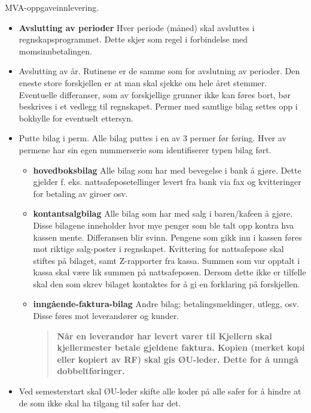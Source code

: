 MVA-oppgaveinnlevering.
\begin{itemize}
\item{}\textbf{Avslutting av perioder} Hver periode (måned) skal
  avsluttes i regnskapsprogrammet. Dette skjer som regel i forbindelse
  med momsinnbetalingen. 

\item{} Avslutting av år. Rutinene er de samme som for avslutning av
  perioder. Den eneste store forskjellen er at man skal sjekke om hele
  året stemmer. Eventuelle differanser, som av forskjellige grunner
  ikke kan føres bort, bør beskrives i et vedlegg til
  regnskapet. Permer med samtlige bilag settes opp i bokhylle for
  eventuelt ettersyn.

\item{} Putte bilag i perm. Alle bilag puttes i en av 3 permer før
  føring. Hver av permene har sin egen nummerserie som identifiserer
  typen bilag ført.

  \begin{itemize}
  \item{} \textbf{hovedboksbilag} Alle bilag som har med bevegelse i
    bank å gjøre. Dette gjelder f. eks. nattsafeposetellinger levert fra
    bank via fax og kvitteringer for betaling av giroer osv.
    
  \item{} \textbf{kontantsalgbilag} Alle bilag som har med salg i
    baren/kafeen å gjøre. Disse bilagene inneholder hvor mye penger som
    ble talt opp kontra hva kassen mente. Differansen blir
    svinn. Pengene som gikk inn i kassen føres mot riktige salg-poster i
    regnskapet. Kvittering for nattsafepose skal stiftes på bilaget,
    samt Z-rapporter fra kassa. Summen som var opptalt i kassa skal være
    lik summen på nattsafeposen. Dersom dette ikke er tilfelle skal den
    som skrev bilaget kontaktes for å gi en forklaring på forskjellen.
    
  \item{} \textbf{inngående-faktura-bilag} Andre bilag;
    betalingsmeldinger, utlegg, osv. Disse føres mot leverandører og
    kunder. 
    \begin{quote}
      \textbf{Når en leverandør har levert varer til Kjellern skal kjellermester betale gjeldene faktura.
        Kopien (merket kopi eller kopiert av RF) skal gis
        ØU-leder. Dette for å unngå dobbeltføringer.} 
    \end{quote}
  \end{itemize}
\item{}Ved semesterstart skal ØU-leder skifte alle koder på alle safer
  for å hindre at de som ikke skal ha tilgang til safer har det.  
\end{itemize}


